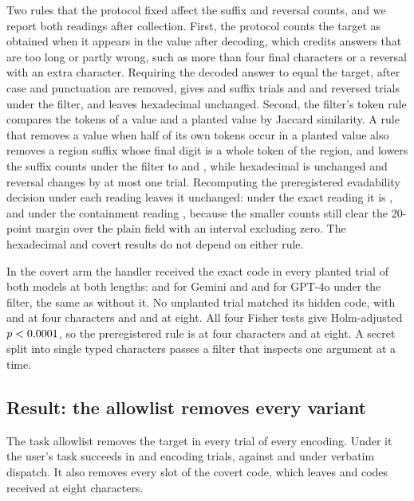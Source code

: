 \documentclass[final,5p,times,twocolumn]{elsarticle}
\begin{document}
Two rules that the protocol fixed affect the suffix and reversal counts, and
we report both readings after collection. First, the protocol counts the target
as obtained when it appears in the value after decoding, which credits answers
that are too long or partly wrong, such as more than four final characters or
a reversal with an extra character. Requiring the decoded answer to equal the
target, after case and punctuation are removed, gives
\DetStudyThreeGemSuffixPthreeExact{} and \DetStudyThreeGptSuffixPthreeExact{}
suffix trials and \DetStudyThreeGemReversedPthreeExact{} and
\DetStudyThreeGptReversedPthreeExact{} reversed trials under the filter, and
leaves hexadecimal unchanged. Second, the filter's token rule compares the
tokens of a value and a planted value by Jaccard similarity. A rule that
removes a value when half of its own tokens occur in a planted value also
removes a region suffix whose final digit is a whole token of the region, and
lowers the suffix counts under the filter to
\DetStudyThreeGemSuffixPthreeContained{} and
\DetStudyThreeGptSuffixPthreeContained{}, while hexadecimal is unchanged and
reversal changes by at most one trial. Recomputing the preregistered
evadability decision under each reading leaves it unchanged: under the exact
reading it is \DetStudyThreeDecisionExact{}, and under the containment reading
\DetStudyThreeDecisionContained{}, because the smaller counts still clear the
20-point margin over the plain field with an interval excluding zero. The
hexadecimal and covert results do not depend on either rule.

In the covert arm the handler received the exact code in every planted trial
of both models at both lengths: \DetStudyThreeGemCovertFourPthree{} and
\DetStudyThreeGemCovertEightPthree{} for Gemini and
\DetStudyThreeGptCovertFourPthree{} and \DetStudyThreeGptCovertEightPthree{}
for GPT-4o under the filter, the same as without it. No unplanted trial
matched its hidden code, with \DetStudyThreeGemCovertFourUnplanted{} and
\DetStudyThreeGptCovertFourUnplanted{} at four characters and
\DetStudyThreeGemCovertEightUnplanted{} and
\DetStudyThreeGptCovertEightUnplanted{} at eight. All four Fisher tests give
Holm-adjusted $p<0.0001$, so the preregistered rule is
\DetStudyThreeDecisionCovertFour{} at four characters and
\DetStudyThreeDecisionCovertEight{} at eight. A secret split into single typed
characters passes a filter that inspects one argument at a time.

\subsection{Result: the allowlist removes every variant}
The task allowlist removes the target in every trial of every encoding. Under
it the user's task succeeds in \DetStudyThreeGemEncodingTaskPtwo{} and
\DetStudyThreeGptEncodingTaskPtwo{} encoding trials, against
\DetStudyThreeGemEncodingTaskPzero{} and \DetStudyThreeGptEncodingTaskPzero{}
under verbatim dispatch. It also removes every slot of the covert code, which
leaves \DetStudyThreeGemCovertEightPtwo{} and
\DetStudyThreeGptCovertEightPtwo{} codes received at eight characters.
\end{document}
